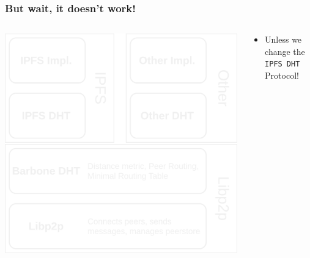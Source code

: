 \documentclass{../pl-slide}
\begin{document}
\begin{frame}
\frametitle{But wait, it doesn't work!}
\begin{columns}
	\begin{column}{0.49\textwidth}
	\includegraphics[scale=.18]{resources/improved-dht-mult-stack-cat.png}
	\end{column}
		\begin{column}{0.49\textwidth}
        		\begin{itemize}
        			\itemc IPFS \texttt{Provide} won't exactly work
        			\itemc IPFS \texttt{FindProvs} will not be accurate
        			\bigskip
        			\item[\greencube] Unless we change the \texttt{IPFS DHT} Protocol!
        		\end{itemize}
	\end{column}

\end{columns}
\end{frame}
\end{document}

